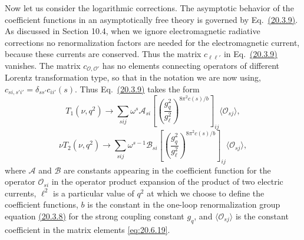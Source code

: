 Now let us consider the logarithmic corrections. The asymptotic behavior of the coefficient functions in an asymptotically free theory is governed by Eq.~\hyperref[eq:20.3.9]{(20.3.9)}. As discussed in Section 10.4, when we ignore electromagnetic radiative corrections no renormalization factors are needed for the electromagnetic current, because these currents are conserved. Thus the matrix $c_{\ell\ell'}$ in Eq.~\hyperref[eq:20.3.9]{(20.3.9)} vanishes. The matrix $c_{\mathcal O,\mathcal O'}$ has no elements connecting operators of different Lorentz transformation type, so that in the notation we are now using, $c_{si,s'i'}=\delta_{ss'}c_{ii'}(s)$. Thus Eq.~\hyperref[eq:20.3.9]{(20.3.9)} takes the form
\begin{equation}
T_1(\nu,q^2)\longrightarrow
\sum_{sij}\omega^s\mathcal A_{si}
\left[
\left(\frac{g_q^2}{g_\ell^2}\right)^{8\pi^2c(s)/b}
\right]_{ij}
\langle\mathcal O_{sj}\rangle,
\tag{20.6.25}\label{eq:20.6.25}
\end{equation}
\begin{equation}
\nu T_2(\nu,q^2)\longrightarrow
\sum_{sij}\omega^{s-1}\mathcal B_{si}
\left[
\left(\frac{g_q^2}{g_\ell^2}\right)^{8\pi^2c(s)/b}
\right]_{ij}
\langle\mathcal O_{sj}\rangle,
\tag{20.6.26}\label{eq:20.6.26}
\end{equation}
where $\mathcal A$ and $\mathcal B$ are constants appearing in the coefficient function for the operator $\mathcal O_{si}$ in the operator product expansion of the product of two electric currents, $\ell^2$ is a particular value of $q^2$ at which we choose to define the coefficient functions, $b$ is the constant in the one-loop renormalization group equation \hyperref[eq:20.3.8]{(20.3.8)} for the strong coupling constant $g_q$, and $\langle\mathcal O_{sj}\rangle$ is the constant coefficient in the matrix elements \eqref{eq:20.6.19}.

